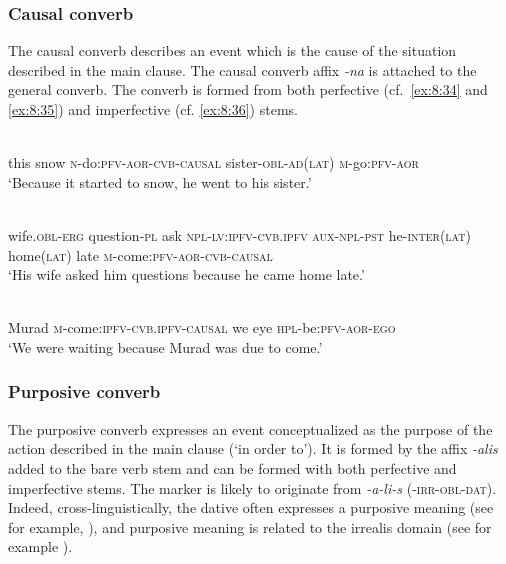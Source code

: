 ﻿\documentclass[output=paper]{langsci/langscibook}
\begin{document}
\subsubsection{Causal converb}

The causal converb describes an event which is the cause of the
situation described in the main clause. The causal converb affix
\emph{-na} is attached to the general converb. The converb is formed
from both perfective (cf.\ \ref{ex:8:34} and \ref{ex:8:35}) and imperfective (cf. \ref{ex:8:36}) stems.

\ea \label{ex:8:34} %
\\
this snow \textsc{n}-do:\textsc{pfv}-\textsc{aor}-\textsc{cvb}-\textsc{causal} sister-\textsc{obl}-\textsc{ad}(\textsc{lat}) \textsc{m}-go:\textsc{pfv}-\textsc{aor}\\
\glt `Because it started to snow, he went to his sister.'

\ex \label{ex:8:35} %
\\
wife.\textsc{obl}-\textsc{erg} question-\textsc{pl} ask \textsc{npl}-\textsc{lv}:\textsc{ipfv}-\textsc{cvb.ipfv} \textsc{aux}-\textsc{npl}-\textsc{pst} he-\textsc{inter}(\textsc{lat}) home(\textsc{lat}) late \textsc{m}-come:\textsc{pfv}-\textsc{aor}-\textsc{cvb}-\textsc{causal}\\
\glt `His wife asked him questions because he came home late.'

\ex \label{ex:8:36} %
\\
Murad \textsc{m}-come:\textsc{ipfv}-\textsc{cvb.ipfv}-\textsc{causal} we eye \textsc{hpl}-be:\textsc{pfv}-\textsc{aor}-\textsc{ego}\\
\glt `We were waiting because Murad was due to come.'
\z

\subsubsection{Purposive converb}

The purposive converb expresses an event conceptualized as the purpose
of the action described in the main clause (`in order to'). It is formed
by the affix \mbox{\emph{-alis}} added to the bare verb stem and can be formed
with both perfective and imperfective stems. The marker is likely to
originate from \emph{-a-li-s} (‑\textsc{irr}-\textsc{obl}-\textsc{dat}). Indeed,
cross-linguistically, the dative often expresses a purposive meaning
(see for example, \citealt{haspelmath1995b}), and purposive meaning is
related to the irrealis domain (see for example \citealt[131]{palmer2001}).
\end{document}
